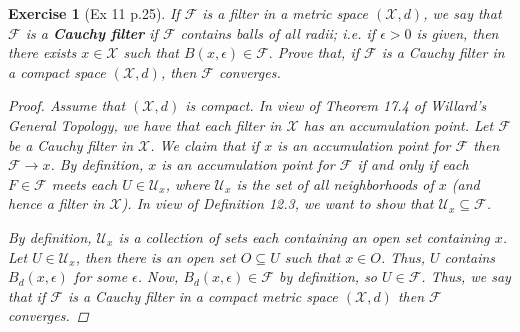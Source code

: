 \documentclass[11pt]{article}
\newtheorem{exercise}{Exercise}
\newcommand{\F}{\mathcal{F}}
\newcommand{\X}{\mathcal{X}}
\begin{document}
\begin{exercise}[Ex 11 p.25]
If $\mathcal{F}$ is a filter in a metric space $(\X , d)$, we say that $\F$ is a \textbf{Cauchy filter} if $\F$ contains balls of all radii; i.e. if $\epsilon > 0$ is given, then there exists $x \in \X$ such that $B(x, \epsilon) \in \F.$ Prove that, if $\F$ is a Cauchy filter in a compact space $(\X , d)$, then $\F$ converges.

	\begin{proof}
	Assume that $(\X,d)$ is compact. In view of Theorem 17.4 of Willard's \textit{General Topology}, we have that each filter in $\X$ has an accumulation point. Let $\F$ be a Cauchy filter in $\X$. We claim that if $x$ is an accumulation point for $\F$ then $\F \to x$. By definition, $x$ is an accumulation point for $\F$ if and only if each $F\in \F$ meets each $U\in \mathcal{U}_x$, where $\mathcal{U}_x$ is the set of all neighborhoods of $x$ (and hence a filter in $\X$). In view of Definition 12.3, we want to show that $\mathcal{U}_x \subseteq \F$. 
	
	By definition, $\mathcal{U}_x$ is a collection of sets each containing an open set containing $x$. Let $U\in \mathcal{U}_x$, then there is an open set $O \subseteq U$ such that $x\in O$. Thus, $U$ contains $B_d(x,\epsilon)$ for some $\epsilon$. Now, $B_d(x,\epsilon) \in \F$ by definition, so $U\in \F$. Thus, we say that if $\F$ is a Cauchy filter in a compact metric space $(\X,d)$ then $\F$ converges.  
	\end{proof}
\end{exercise}
\end{document}
